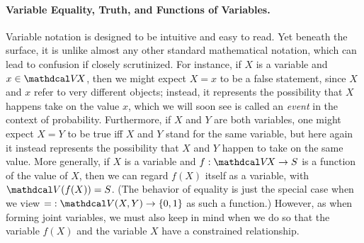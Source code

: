 \paragraph{Variable Equality, Truth, and Functions of Variables.}
Variable notation is designed to be intuitive and easy to read. 
Yet beneath the surface,
it is unlike almost any other standard mathematical notation,
    which can lead to confusion if closely scrutinized.
For instance,
if $X$ is a variable and $x \in \V\!X$, then we might expect $X{=}x$ to be a false statement, since $X$ and $x$ refer to very different objects; instead, it represents the possibility that $X$ happens take on the value $x$, which we will soon see is called an \emph{event} in the context of probability. 
Furthermore, if $X$ and $Y$ are both variables, one might expect $X{=}Y$ to be true iff $X$ and $Y$ stand for the same variable, but here again it instead represents the possibility that $X$ and $Y$ happen to take on the same value. 
%
More generally, 
if $X$ is a variable and $f : \V\!X \to S$ is a function of the value of $X$, then we can regard $f(X)$ itself as a variable, with $\V(f(X)) = S$. 
(The behavior of equality 
is just the special case when we view ${=} : \V(X,Y) \to \{0,1\}$ as such a function.)
%
However, as when forming joint variables, we must also keep in mind when we do so that the variable $f(X)$ and the variable $X$ have a constrained relationship.

